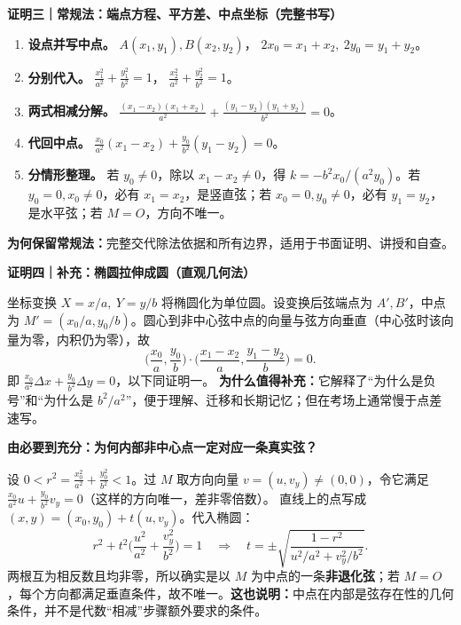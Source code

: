 \begin{proofbox}
\textbf{\textcolor{CProof}{证明三｜常规法：端点方程、平方差、中点坐标（完整书写）}}
\begin{center}\end{center}
\begin{enumerate}[leftmargin=*,itemsep=0.35em]
\item \textbf{设点并写中点。} $A(x_1,y_1),B(x_2,y_2)$，
$2x_0=x_1+x_2,\ 2y_0=y_1+y_2$。
\item \textbf{分别代入。}
$\frac{x_1^2}{a^2}+\frac{y_1^2}{b^2}=1$，
$\frac{x_2^2}{a^2}+\frac{y_2^2}{b^2}=1$。
\item \textbf{两式相减分解。}
$\frac{(x_1-x_2)(x_1+x_2)}{a^2}+
\frac{(y_1-y_2)(y_1+y_2)}{b^2}=0$。
\item \textbf{代回中点。} $\frac{x_0}{a^2}(x_1-x_2)+\frac{y_0}{b^2}(y_1-y_2)=0$。
\item \textbf{分情形整理。} 若 $y_0\ne0$，除以 $x_1-x_2\ne0$，得 $k=-b^2x_0/(a^2y_0)$。若 $y_0=0,x_0\ne0$，必有 $x_1=x_2$，是竖直弦；若 $x_0=0,y_0\ne0$，必有 $y_1=y_2$，是水平弦；若 $M=O$，方向不唯一。
\end{enumerate}
\textbf{为何保留常规法：}完整交代除法依据和所有边界，适用于书面证明、讲授和自查。
\end{proofbox}
\clearpage
\begin{proofbox}
\textbf{\textcolor{CProof}{证明四｜补充：椭圆拉伸成圆（直观几何法）}}
\begin{center}\end{center}
坐标变换 $X=x/a,\ Y=y/b$ 将椭圆化为单位圆。设变换后弦端点为 $A',B'$，中点为 $M'=(x_0/a,y_0/b)$。圆心到非中心弦中点的向量与弦方向垂直（中心弦时该向量为零，内积仍为零），故
\[
\bigg(\frac{x_0}{a},\frac{y_0}{b}\bigg)\cdot
\bigg(\frac{x_1-x_2}{a},\frac{y_1-y_2}{b}\bigg)=0.
\]
即 $\frac{x_0}{a^2}\Delta x+\frac{y_0}{b^2}\Delta y=0$，以下同证明一。
\textbf{为什么值得补充：}它解释了“为什么是负号”和“为什么是 $b^2/a^2$”，便于理解、迁移和长期记忆；但在考场上通常慢于点差速写。
\end{proofbox}
\clearpage
\begin{proofbox}
\textbf{\textcolor{CProof}{由必要到充分：为何内部非中心点一定对应一条真实弦？}}
\begin{center}\end{center}
设 $0<r^2=\frac{x_0^2}{a^2}+\frac{y_0^2}{b^2}<1$。过 $M$ 取方向向量 $v=(u,v_y)\ne(0,0)$，令它满足
$\frac{x_0}{a^2}u+\frac{y_0}{b^2}v_y=0$（这样的方向唯一，差非零倍数）。
直线上的点写成 $(x,y)=(x_0,y_0)+t(u,v_y)$。代入椭圆：
\[
 r^2+t^2\bigg(\frac{u^2}{a^2}+\frac{v_y^2}{b^2}\bigg)=1
 \quad\Longrightarrow\quad
 t=\pm\sqrt{\frac{1-r^2}{u^2/a^2+v_y^2/b^2}}.
\]
两根互为相反数且均非零，所以确实是以 $M$ 为中点的一条\textbf{非退化弦}；若 $M=O$，每个方向都满足垂直条件，故不唯一。\textbf{这也说明：}中点在内部是弦存在性的几何条件，并不是代数“相减”步骤额外要求的条件。
\end{proofbox}
